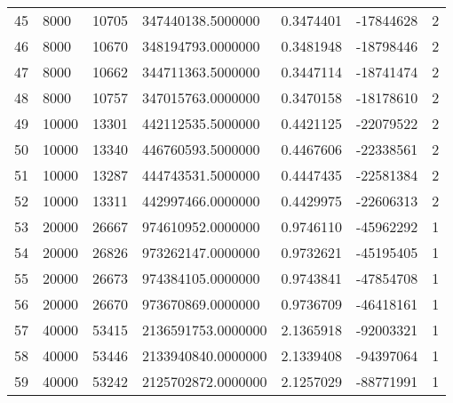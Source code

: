 \begin{longtable}{lllllll}
    45               & 8000           & 10705          & 347440138.5000000  & 0.3474401        & -17844628       & 2                    \\
    46               & 8000           & 10670          & 348194793.0000000  & 0.3481948        & -18798446       & 2                    \\
    47               & 8000           & 10662          & 344711363.5000000  & 0.3447114        & -18741474       & 2                    \\
    48               & 8000           & 10757          & 347015763.0000000  & 0.3470158        & -18178610       & 2                    \\
    49               & 10000          & 13301          & 442112535.5000000  & 0.4421125        & -22079522       & 2                    \\
    50               & 10000          & 13340          & 446760593.5000000  & 0.4467606        & -22338561       & 2                    \\
    51               & 10000          & 13287          & 444743531.5000000  & 0.4447435        & -22581384       & 2                    \\
    52               & 10000          & 13311          & 442997466.0000000  & 0.4429975        & -22606313       & 2                    \\
    53               & 20000          & 26667          & 974610952.0000000  & 0.9746110        & -45962292       & 1                    \\
    54               & 20000          & 26826          & 973262147.0000000  & 0.9732621        & -45195405       & 1                    \\
    55               & 20000          & 26673          & 974384105.0000000  & 0.9743841        & -47854708       & 1                    \\
    56               & 20000          & 26670          & 973670869.0000000  & 0.9736709        & -46418161       & 1                    \\
    57               & 40000          & 53415          & 2136591753.0000000 & 2.1365918        & -92003321       & 1                    \\
    58               & 40000          & 53446          & 2133940840.0000000 & 2.1339408        & -94397064       & 1                    \\
    59               & 40000          & 53242          & 2125702872.0000000 & 2.1257029        & -88771991       & 1                    \\

\end{longtable}
